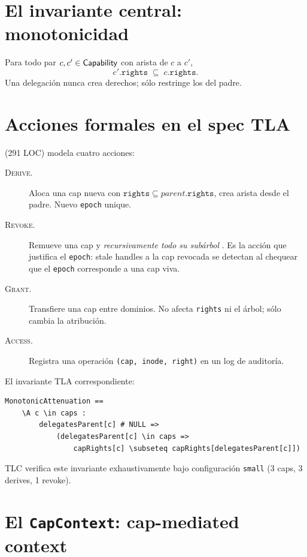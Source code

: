 \section{El invariante central: monotonicidad}

\begin{invariante}
\label{inv:cap-mono}
Para todo par $c, c' \in \textsf{Capability}$ con arista \edelegates{} de $c$ a $c'$,
\[
  c'.\texttt{rights} \;\subseteq\; c.\texttt{rights}.
\]
Una delegación nunca crea derechos; sólo restringe los del padre.
\end{invariante}

\section{Acciones formales en el spec TLA}

 (291 LOC) modela cuatro acciones:

\begin{description}
  \item[\textsc{Derive}.] Aloca una cap nueva con $\texttt{rights}
    \subseteq \mathit{parent}.\texttt{rights}$, crea arista
    \edelegates{} desde el padre. Nuevo \texttt{epoch} unique.
  \item[\textsc{Revoke}.] Remueve una cap y \emph{recursivamente todo
    su subárbol} \edelegates{}. Es la acción que justifica el
    \texttt{epoch}: stale handles a la cap revocada se detectan al
    chequear que el \texttt{epoch} corresponde a una cap viva.
  \item[\textsc{Grant}.] Transfiere una cap entre dominios. No afecta
    \texttt{rights} ni el árbol; sólo cambia la atribución.
  \item[\textsc{Access}.] Registra una operación
    \texttt{(cap, inode, right)} en un log de auditoría.
\end{description}

El invariante TLA correspondiente:

\begin{lstlisting}[language=tla]
MonotonicAttenuation ==
    \A c \in caps :
        delegatesParent[c] # NULL =>
            (delegatesParent[c] \in caps =>
                capRights[c] \subseteq capRights[delegatesParent[c]])
\end{lstlisting}

TLC verifica este invariante exhaustivamente bajo configuración
\texttt{small} (3 caps, 3 derives, 1 revoke).

\section{El \texttt{CapContext}: cap-mediated context}


